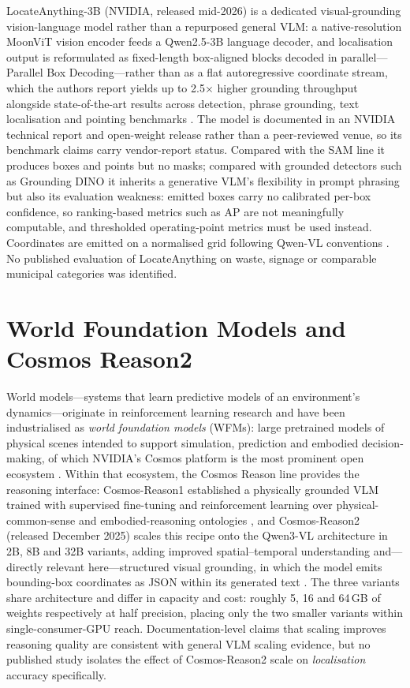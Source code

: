 LocateAnything-3B (NVIDIA, released mid-2026) is a dedicated visual-grounding vision-language model rather than a repurposed general VLM: a native-resolution MoonViT vision encoder feeds a Qwen2.5-3B language decoder, and localisation output is reformulated as fixed-length box-aligned blocks decoded in parallel---Parallel Box Decoding---rather than as a flat autoregressive coordinate stream, which the authors report yields up to 2.5$\times$ higher grounding throughput alongside state-of-the-art results across detection, phrase grounding, text localisation and pointing benchmarks \citep{nvidia2026locateanything}. The model is documented in an NVIDIA technical report and open-weight release rather than a peer-reviewed venue, so its benchmark claims carry vendor-report status. Compared with the SAM line it produces boxes and points but no masks; compared with grounded detectors such as Grounding DINO it inherits a generative VLM's flexibility in prompt phrasing but also its evaluation weakness: emitted boxes carry no calibrated per-box confidence, so ranking-based metrics such as AP are not meaningfully computable, and thresholded operating-point metrics must be used instead. Coordinates are emitted on a normalised grid following Qwen-VL conventions \citep{bai2025qwen25vl}. No published evaluation of LocateAnything on waste, signage or comparable municipal categories was identified.

\section{World Foundation Models and Cosmos Reason2}
\label{sec:lr-cosmos}

World models---systems that learn predictive models of an environment's dynamics---originate in reinforcement learning research \citep{ha2018world} and have been industrialised as \emph{world foundation models} (WFMs): large pretrained models of physical scenes intended to support simulation, prediction and embodied decision-making, of which NVIDIA's Cosmos platform is the most prominent open ecosystem \citep{nvidia2025cosmosplatform}. Within that ecosystem, the Cosmos Reason line provides the reasoning interface: Cosmos-Reason1 established a physically grounded VLM trained with supervised fine-tuning and reinforcement learning over physical-common-sense and embodied-reasoning ontologies \citep{nvidia2025cosmosreason1}, and Cosmos-Reason2 (released December 2025) scales this recipe onto the Qwen3-VL architecture in 2B, 8B and 32B variants, adding improved spatial--temporal understanding and---directly relevant here---structured visual grounding, in which the model emits bounding-box coordinates as JSON within its generated text \citep{nvidia2025cosmosreason2}. The three variants share architecture and differ in capacity and cost: roughly 5, 16 and 64\,GB of weights respectively at half precision, placing only the two smaller variants within single-consumer-GPU reach. Documentation-level claims that scaling improves reasoning quality are consistent with general VLM scaling evidence, but no published study isolates the effect of Cosmos-Reason2 scale on \emph{localisation} accuracy specifically.

